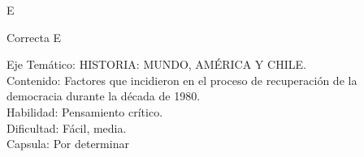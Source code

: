 \documentclass[letterpaper,11pt]{article}
\newcommand{\anchopregunta}{0.9\textwidth}
\begin{document}
\begin{enumerate}
\begin{minipage}{\anchopregunta}
\begin{key} E
\end{key} 
\begin{hint}
\end{hint}
\begin{answer} Correcta E \\
\end{answer}
\begin{info} %
\begin{flushleft}
Eje Temático: HISTORIA: MUNDO, AMÉRICA Y CHILE.\\
Contenido: Factores que incidieron en el proceso de recuperación de la democracia durante la década de 1980.\\
Habilidad: Pensamiento crítico.\\
Dificultad: Fácil, media.\\
Capsula: Por determinar \\
\end{flushleft} 
\end{info}
\end{minipage}\vfill$\;$ %


\end{enumerate}
\end{document}
